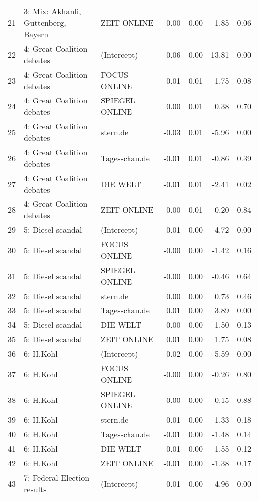 \begin{table}[ht]
{\begin{tabular}{rllrrrr}
  21 & 3: Mix: Akhanli, Guttenberg, Bayern & ZEIT ONLINE & -0.00 & 0.00 & -1.85 & 0.06 \\ 
  22 & 4: Great Coalition debates & (Intercept) & 0.06 & 0.00 & 13.81 & 0.00 \\ 
  23 & 4: Great Coalition debates & FOCUS ONLINE & -0.01 & 0.01 & -1.75 & 0.08 \\ 
  24 & 4: Great Coalition debates & SPIEGEL ONLINE & 0.00 & 0.01 & 0.38 & 0.70 \\ 
  25 & 4: Great Coalition debates & stern.de & -0.03 & 0.01 & -5.96 & 0.00 \\ 
  26 & 4: Great Coalition debates & Tagesschau.de & -0.01 & 0.01 & -0.86 & 0.39 \\ 
  27 & 4: Great Coalition debates & DIE WELT & -0.01 & 0.01 & -2.41 & 0.02 \\ 
  28 & 4: Great Coalition debates & ZEIT ONLINE & 0.00 & 0.01 & 0.20 & 0.84 \\ 
  29 & 5: Diesel scandal & (Intercept) & 0.01 & 0.00 & 4.72 & 0.00 \\ 
  30 & 5: Diesel scandal & FOCUS ONLINE & -0.00 & 0.00 & -1.42 & 0.16 \\ 
  31 & 5: Diesel scandal & SPIEGEL ONLINE & -0.00 & 0.00 & -0.46 & 0.64 \\ 
  32 & 5: Diesel scandal & stern.de & 0.00 & 0.00 & 0.73 & 0.46 \\ 
  33 & 5: Diesel scandal & Tagesschau.de & 0.01 & 0.00 & 3.89 & 0.00 \\ 
  34 & 5: Diesel scandal & DIE WELT & -0.00 & 0.00 & -1.50 & 0.13 \\ 
  35 & 5: Diesel scandal & ZEIT ONLINE & 0.01 & 0.00 & 1.75 & 0.08 \\ 
  36 & 6: H.Kohl & (Intercept) & 0.02 & 0.00 & 5.59 & 0.00 \\ 
  37 & 6: H.Kohl & FOCUS ONLINE & -0.00 & 0.00 & -0.26 & 0.80 \\ 
  38 & 6: H.Kohl & SPIEGEL ONLINE & 0.00 & 0.00 & 0.15 & 0.88 \\ 
  39 & 6: H.Kohl & stern.de & 0.01 & 0.00 & 1.33 & 0.18 \\ 
  40 & 6: H.Kohl & Tagesschau.de & -0.01 & 0.00 & -1.48 & 0.14 \\ 
  41 & 6: H.Kohl & DIE WELT & -0.01 & 0.00 & -1.55 & 0.12 \\ 
  42 & 6: H.Kohl & ZEIT ONLINE & -0.01 & 0.00 & -1.38 & 0.17 \\ 
  43 & 7: Federal Election results & (Intercept) & 0.01 & 0.00 & 4.96 & 0.00 \\ 

\end{tabular}}
\end{table}

